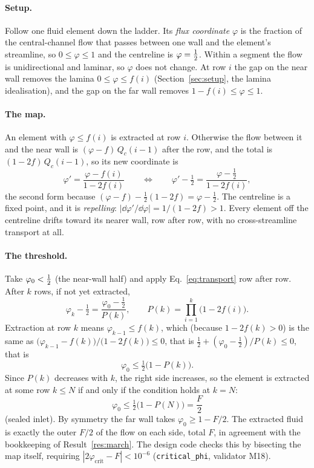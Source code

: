 \paragraph{Setup.} Follow one fluid element down the ladder. Its \emph{flux coordinate}
$\varphi$ is the fraction of the central-channel flow that passes between one wall and the
element's streamline, so $0\le\varphi\le1$ and the centreline is $\varphi=\tfrac{1}{2}$. Within a
segment the flow is unidirectional and laminar, so $\varphi$ does not change. At row $i$ the gap
on the near wall removes the lamina $0\le\varphi\le f(i)$ (Section~\ref{sec:setup}, the lamina
idealisation), and the gap on the far wall removes $1-f(i)\le\varphi\le1$.

\paragraph{The map.} An element with $\varphi\le f(i)$ is extracted at row $i$. Otherwise the
flow between it and the near wall is $(\varphi-f)\,Q_c(i-1)$ after the row, and the total is
$(1-2f)\,Q_c(i-1)$, so its new coordinate is
\begin{equation}
\varphi'=\frac{\varphi-f(i)}{1-2f(i)}
\qquad\Longleftrightarrow\qquad
\varphi'-\tfrac12=\frac{\varphi-\tfrac12}{1-2f(i)} ,
\label{eq:transport}
\end{equation}
the second form because $(\varphi-f)-\tfrac12(1-2f)=\varphi-\tfrac12$. The centreline is a fixed
point, and it is \emph{repelling}: $|\dd\varphi'/\dd\varphi|=1/(1-2f)>1$. Every element off the
centreline drifts toward its nearer wall, row after row, with no cross-streamline transport at
all.

\paragraph{The threshold.} Take $\varphi_0<\tfrac{1}{2}$ (the near-wall half) and apply
Eq.~\eqref{eq:transport} row after row. After $k$ rows, if not yet extracted,
\begin{equation}
\varphi_k-\tfrac12=\frac{\varphi_0-\tfrac12}{P(k)},\qquad P(k)=\prod_{i=1}^{k}\big(1-2f(i)\big).
\end{equation}
Extraction at row $k$ means $\varphi_{k-1}\le f(k)$, which (because $1-2f(k)>0$) is the same as
$\big(\varphi_{k-1}-f(k)\big)/\big(1-2f(k)\big)\le0$, that is
$\tfrac12+(\varphi_0-\tfrac12)/P(k)\le0$, that is
\begin{equation}
\varphi_0\le\tfrac12\big(1-P(k)\big).
\end{equation}
Since $P(k)$ decreases with $k$, the right side increases, so the element is extracted at some
row $k\le N$ if and only if the condition holds at $k=N$:
\begin{equation}
\boxed{\,\varphi_0\le\tfrac12\big(1-P(N)\big)=\frac{F}{2}\,}
\end{equation}
(sealed inlet). By symmetry the far wall takes $\varphi_0\ge1-F/2$. The extracted fluid is
exactly the outer $F/2$ of the flow on each side, total $F$, in agreement with the bookkeeping of
Result~\ref{res:march}. The design code checks this by bisecting the map itself, requiring
$|2\varphi_{\mathrm{crit}}-F|<10^{-6}$ (\texttt{critical\_phi}, validator M18).

